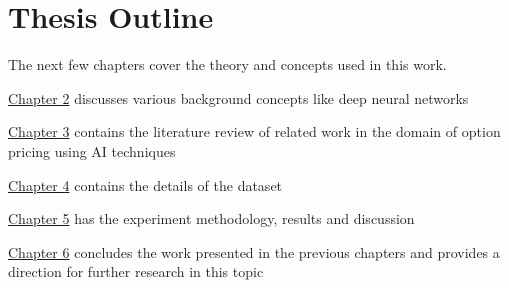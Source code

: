 \section{Thesis Outline}

The next few chapters cover the theory and concepts used in this work.

\hyperref[Chapter2]{Chapter 2} discusses various background concepts like deep neural networks

\hyperref[Chapter3]{Chapter 3} contains the literature review of related work in the domain of option pricing using AI techniques

\hyperref[Chapter4]{Chapter 4} contains the details of the dataset  

\hyperref[Chapter5]{Chapter 5} has the  experiment methodology, results and discussion

\hyperref[Chapter6]{Chapter 6}  concludes the work presented in the previous chapters and provides a direction for further research in this topic






